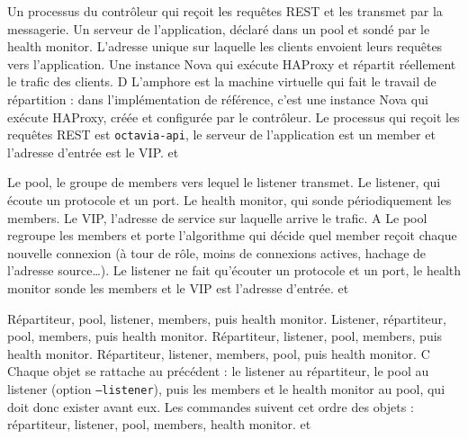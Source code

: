   {Un processus du contrôleur qui reçoit les requêtes REST et les transmet par la messagerie.}
  {Un serveur de l'application, déclaré dans un pool et sondé par le health monitor.}
  {L'adresse unique sur laquelle les clients envoient leurs requêtes vers l'application.}
  {Une instance Nova qui exécute HAProxy et répartit réellement le trafic des clients.}
  {D}
  {L'amphore est la machine virtuelle qui fait le travail de répartition : dans l'implémentation de référence, c'est une instance Nova qui exécute HAProxy, créée et configurée par le contrôleur. Le processus qui reçoit les requêtes REST est \texttt{octavia-api}, le serveur de l'application est un member et l'adresse d'entrée est le VIP.}
  { et }

  {Le pool, le groupe de members vers lequel le listener transmet.}
  {Le listener, qui écoute un protocole et un port.}
  {Le health monitor, qui sonde périodiquement les members.}
  {Le VIP, l'adresse de service sur laquelle arrive le trafic.}
  {A}
  {Le pool regroupe les members et porte l'algorithme qui décide quel member reçoit chaque nouvelle connexion (à tour de rôle, moins de connexions actives, hachage de l'adresse source\dots). Le listener ne fait qu'écouter un protocole et un port, le health monitor sonde les members et le VIP est l'adresse d'entrée.}
  { et }

  {Répartiteur, pool, listener, members, puis health monitor.}
  {Listener, répartiteur, pool, members, puis health monitor.}
  {Répartiteur, listener, pool, members, puis health monitor.}
  {Répartiteur, listener, members, pool, puis health monitor.}
  {C}
  {Chaque objet se rattache au précédent : le listener au répartiteur, le pool au listener (option \texttt{--listener}), puis les members et le health monitor au pool, qui doit donc exister avant eux. Les commandes suivent cet ordre des objets : répartiteur, listener, pool, members, health monitor.}
  { et }

